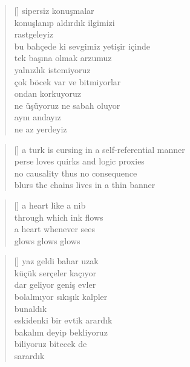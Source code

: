 \documentclass[a5paper, openright, twoside]{memoir}
\begin{document}
\begin{verse}[\versewidth]
  sipersiz konuşmalar \\
  konuşlanıp aldırdık ilgimizi \\
  rastgeleyiz \\
  bu bahçede ki sevgimiz yetişir içinde \\
  tek başına olmak arzumuz \\
  yalnızlık istemiyoruz \\
  çok böcek var ve bitmiyorlar \\
  ondan korkuyoruz \\
  ne üşüyoruz ne sabah oluyor \\
  aynı andayız \\
  ne az yerdeyiz \\
\end{verse}
\begin{verse}[\versewidth]
  a turk is cursing in a self-referential manner \\
  perse loves quirks and logic proxies \\
  no causality thus no consequence \\
  blurs the chains lives in a thin banner \\
\end{verse}
\begin{verse}[\versewidth]
  a heart like a nib \\
  through which ink flows \\
  a heart whenever sees \\
  glows glows glows \\
\end{verse}
\begin{verse}[\versewidth]
  yaz geldi bahar uzak \\
  küçük serçeler kaçıyor \\
  dar geliyor geniş evler \\
  bolalmıyor sıkışık kalpler \\
  bunaldık \\
  eskidenki bir evtik arardık \\
  bakalım deyip bekliyoruz \\
  biliyoruz bitecek de \\
  sarardık \\
\end{verse}
\end{document}
